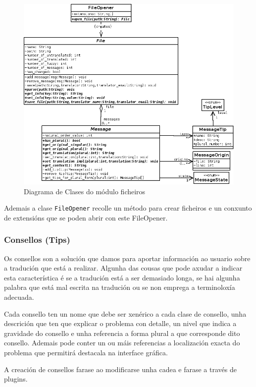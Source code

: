 \begin{figure}[h!]
    \centering
    \includegraphics[width=\textwidth]{img/genericfile.png}
    \caption{Diagrama de Clases do módulo ficheiros}
    \label{fig:dia_class:files}
\end{figure}

Ademais a clase \lstinline{FileOpener} recolle un método para crear ficheiros e un conxunto de extensións que se poden abrir con este FileOpener.

\subsubsection{Consellos (Tips)}
Os consellos son a solución que damos para aportar información ao usuario sobre a tradución que está a realizar. Algunha das cousas que pode axudar a indicar esta característica é se a tradución está a ser demasiado longa, se hai algunha palabra que está mal escrita na tradución ou se non emprega a terminoloxía adecuada.

Cada consello ten un nome que debe ser xenérico a cada clase de consello, unha descrición que ten que explicar o problema con detalle, un nivel que indica a gravidade do consello e unha referencia a forma plural a que corresponde dito consello. Ademais pode conter un ou máis referencias a localización exacta do problema que permitirá destacala na interface gráfica.

A creación de consellos farase ao modificarse unha cadea e farase a través de plugins.

